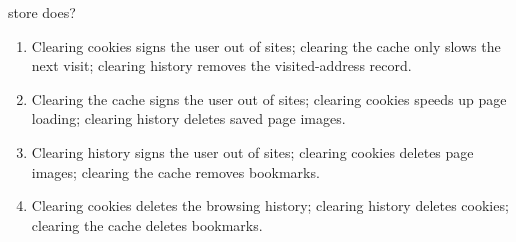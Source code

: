 \documentclass[11pt]{article}
\begin{document}
\begin{enumerate}[label=\textbf{Q\arabic*.}, leftmargin=*]
  store does?
  \begin{enumerate}[label=\Alph*.]
    \item Clearing cookies signs the user out of sites; clearing the cache only slows the next visit; clearing history removes the visited-address record.
    \item Clearing the cache signs the user out of sites; clearing cookies speeds up page loading; clearing history deletes saved page images.
    \item Clearing history signs the user out of sites; clearing cookies deletes page images; clearing the cache removes bookmarks.
    \item Clearing cookies deletes the browsing history; clearing history deletes cookies; clearing the cache deletes bookmarks.
  \end{enumerate}


\end{enumerate}
\end{document}
